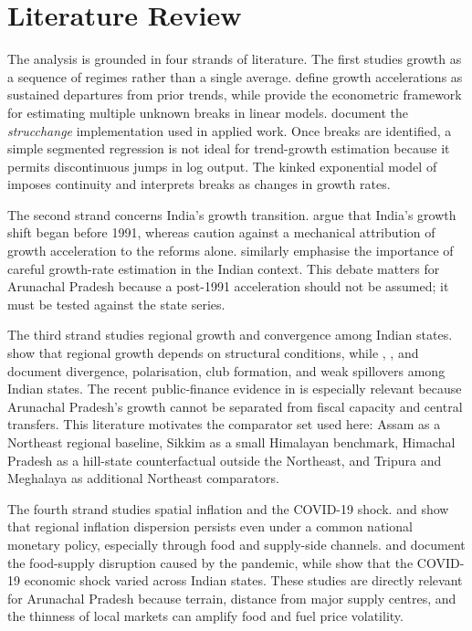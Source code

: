 \documentclass[11pt,a4paper]{article}
\begin{document}
\section{Literature Review}

The analysis is grounded in four strands of literature. The first studies growth as a sequence of regimes rather than a single average. \citet{hausmann_pritchett_rodrik_2004} define growth accelerations as sustained departures from prior trends, while \citet{bai_perron_1998,bai_perron_2003} provide the econometric framework for estimating multiple unknown breaks in linear models. \citet{zeileis_leisch_hornik_kleiber_2002} document the \textit{strucchange} implementation used in applied work. Once breaks are identified, a simple segmented regression is not ideal for trend-growth estimation because it permits discontinuous jumps in log output. The kinked exponential model of \citet{boyce_1986} imposes continuity and interprets breaks as changes in growth rates.

The second strand concerns India's growth transition. \citet{rodrik_subramanian_2005} argue that India's growth shift began before 1991, whereas \citet{agarwal_whalley_2013} caution against a mechanical attribution of growth acceleration to the reforms alone. \citet{balakrishnan_parameswaran_2007} similarly emphasise the importance of careful growth-rate estimation in the Indian context. This debate matters for Arunachal Pradesh because a post-1991 acceleration should not be assumed; it must be tested against the state series.

The third strand studies regional growth and convergence among Indian states. \citet{sachs_bajpai_ramiah_2002} show that regional growth depends on structural conditions, while \citet{bhattacharya_sakthivel_2004}, \citet{bandyopadhyay_2011}, and \citet{sodsriwiboon_kalra_2010} document divergence, polarisation, club formation, and weak spillovers among Indian states. The recent public-finance evidence in \citet{govil_chauhan_2024} is especially relevant because Arunachal Pradesh's growth cannot be separated from fiscal capacity and central transfers. This literature motivates the comparator set used here: Assam as a Northeast regional baseline, Sikkim as a small Himalayan benchmark, Himachal Pradesh as a hill-state counterfactual outside the Northeast, and Tripura and Meghalaya as additional Northeast comparators.

The fourth strand studies spatial inflation and the COVID-19 shock. \citet{kundu_kishore_bhoi_2018} and \citet{jha_dhal_2019} show that regional inflation dispersion persists even under a common national monetary policy, especially through food and supply-side channels. \citet{mahajan_tomar_2021} and \citet{narayanan_saha_2021} document the food-supply disruption caused by the pandemic, while \citet{beyer_francobedoya_galdo_2021} show that the COVID-19 economic shock varied across Indian states. These studies are directly relevant for Arunachal Pradesh because terrain, distance from major supply centres, and the thinness of local markets can amplify food and fuel price volatility.
\end{document}
